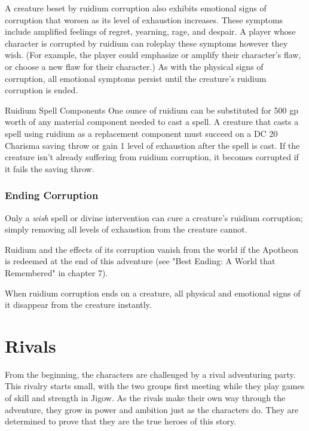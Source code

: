 \documentclass[10pt,a4paper,twoside,fancy,bg=print,twocolumn,openany,nodeprecatedcode]{dndbook}
\begin{document}
A creature beset by ruidium corruption also exhibits emotional signs of corruption that worsen as its level of exhaustion increases. These symptoms include amplified feelings of regret, yearning, rage, and despair. A player whose character is corrupted by ruidium can roleplay these symptoms however they wish. (For example, the player could emphasize or amplify their character's flaw, or choose a new flaw for their character.) As with the physical signs of corruption, all emotional symptoms persist until the creature's ruidium corruption is ended.

\begin{DndSidebar}[float=!b]{Ruidium Spell Components}
One ounce of ruidium can be substituted for 500 gp worth of any material component needed to cast a spell. A creature that casts a spell using ruidium as a replacement component must succeed on a DC 20 Charisma saving throw or gain 1 level of exhaustion after the spell is cast. If the creature isn't already suffering from ruidium corruption, it becomes corrupted if it fails the saving throw.



\end{DndSidebar}

\subsubsection{Ending Corruption}
Only a \textit{wish} spell or divine intervention can cure a creature's ruidium corruption; simply removing all levels of exhaustion from the creature cannot.

Ruidium and the effects of its corruption vanish from the world if the Apotheon is redeemed at the end of this adventure (see "Best Ending: A World that Remembered" in chapter 7).

When ruidium corruption ends on a creature, all physical and emotional signs of it disappear from the creature instantly.

\section{Rivals}
From the beginning, the characters are challenged by a rival adventuring party. This rivalry starts small, with the two groups first meeting while they play games of skill and strength in Jigow. As the rivals make their own way through the adventure, they grow in power and ambition just as the characters do. They are determined to prove that they are the true heroes of this story.
\end{document}
